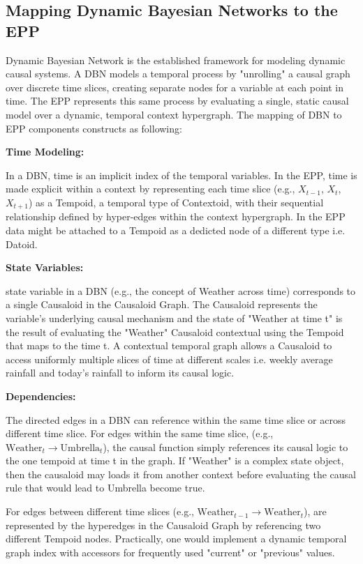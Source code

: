 %
%
\subsection{Mapping Dynamic Bayesian Networks to the EPP}
\label{sec:epp_Dynamic_Bayesian_Networks}

Dynamic Bayesian Network is the established framework for modeling dynamic causal systems. A DBN models a temporal process by "unrolling" a causal graph over discrete time slices, creating separate nodes for a variable at each point in time. The EPP represents this same process   by evaluating a single, static causal model over a dynamic, temporal context hypergraph. The mapping of DBN to EPP components constructs as following:
 
 \textbf{Time Modeling:}
 
 In a DBN, time is an implicit index of the temporal variables. In the EPP, time is made explicit within a
 context by representing each time slice (e.g., $X_{t-1}$, $X_t$, $X_{t+1}$) as a Tempoid, a temporal type of Contextoid, with their sequential relationship defined by hyper-edges within the context hypergraph. In the EPP data might be attached to a Tempoid as a dedicted node of a different type i.e. Datoid. 

 \textbf{State Variables:}
 
state variable in a DBN (e.g., the concept of Weather across time) corresponds to a single Causaloid in the Causaloid Graph. The Causaloid represents the variable's underlying causal mechanism and the state of "Weather at time t" is the result of evaluating the "Weather" Causaloid contextual using the Tempoid that maps to the time t. A contextual temporal graph allows a Causaloid to access uniformly multiple slices of time at different scales i.e. weekly average rainfall and today's rainfall to inform its causal logic. 

\textbf{Dependencies:}

The directed edges in a DBN can reference  within the same time slice or across different time slice.
For edges within the same time slice, (e.g., $\text{Weather}_t \to \text{Umbrella}_t$), the causal function simply references its causal logic to the one tempoid at time t in the graph. If "Weather" is a complex state object, then the causaloid may loads it from another context before evaluating the causal rule that would lead to Umbrella become true.

For edges between different time slices (e.g., $\text{Weather}_{t-1} \to \text{Weather}_t$),  are represented by the hyperedges in the Causaloid Graph by referencing two different Tempoid nodes. Practically, one would implement a dynamic temporal graph index with accessors for frequently used "current" or "previous" values. 


